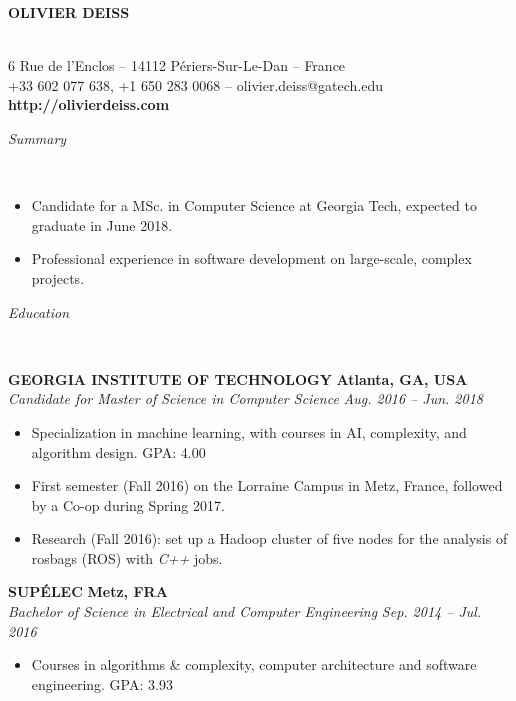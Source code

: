 \documentclass[a4paper, 12pt]{article}
\newcommand{\marginline}{-0.3cm}
\newcommand{\margincontent}{-0.6cm}
\newcommand{\marginsummary}{-0.3cm}
\newcommand{\marginbeforesection}{0.35cm}
\newcommand{\marginaftersummary}{0.2cm}
\newcommand{\linewidthperso}{0.02cm}
\newcommand{\styletitle}[1]{\textbf{#1}}
\newcommand{\styledesc}[1]{\textit{#1}}
\newcommand{\styleloc}[1]{\textbf{#1}}
\newcommand{\styledates}[1]{\textit{#1}}
\newcommand{\stylesection}[1]{
  \vspace{\marginbeforesection}
  \begin{normalsize}\textit{#1}\end{normalsize}
  \vspace{\marginline}\\
  \noindent\makebox[\linewidth]{\rule{\textwidth}{\linewidthperso}}

}
\begin{document}
\begin{footnotesize}

\begin{center}
  \begin{small}\textbf{OLIVIER DEISS}\end{small}\\
  6 Rue de l'Enclos -- 14112 P\'eriers-Sur-Le-Dan -- France\\
  +33 602 077 638, +1 650 283 0068 -- olivier.deiss@gatech.edu\\
  \textbf{http://olivierdeiss.com}
\end{center}

\stylesection{Summary}

\vspace{\marginsummary}
\begin{itemize}
  \item Candidate for a MSc. in Computer Science at Georgia Tech, expected to graduate in June 2018.
  \item Professional experience in software development on large-scale, complex projects.
\end{itemize}
\vspace{\marginaftersummary}

\stylesection{Education}

\styletitle{GEORGIA INSTITUTE OF TECHNOLOGY} \hfill \styleloc{Atlanta, GA, USA}\\
\styledesc{Candidate for Master of Science in Computer Science} \hfill \styledates{Aug. 2016 -- Jun. 2018}\\
\vspace{\margincontent}
\begin{itemize}
  \item Specialization in machine learning, with courses in AI, complexity, and algorithm design. \hfill GPA: 4.00
  \item First semester (Fall 2016) on the Lorraine Campus in Metz, France, followed by a Co-op during Spring 2017.
  \item Research (Fall 2016): set up a Hadoop cluster of five nodes for the analysis of rosbags (ROS) with \textit{C++} jobs.
\end{itemize}

\styletitle{SUP\'ELEC} \hfill \styleloc{Metz, FRA}\\
\styledesc{Bachelor of Science in Electrical and Computer Engineering} \hfill \styledates{Sep. 2014 -- Jul. 2016}\\
\vspace{\margincontent}
\begin{itemize}
  \item Courses in algorithms \& complexity, computer architecture and software engineering. \hfill GPA: 3.93
\end{itemize}


\end{footnotesize}
\end{document}
